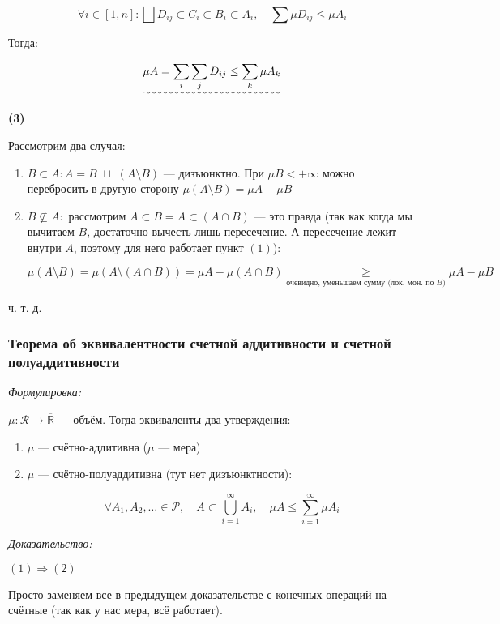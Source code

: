 \documentclass{article}
\def\dbl{\,\,}
\begin{document}
\[\forall i \in [1, n]: \bigsqcup D_{ij} \subset C_i \subset B_i \subset A_i, \quad \sum \mu D_{ij} \le \mu A_i\]

Тогда: 

\[\uwave{\mu A = \sum_{i} \sum_{j} D_{ij} \le \sum_{k} \mu A_k}\]

\textbf{(3)}

Рассмотрим два случая: 

\begin{enumerate}
    \item $B \subset A: A = B \dbl \sqcup \dbl (A \setminus B)$ --- дизъюнктно. При $\mu B < + \infty $ можно перебросить в другую сторону $\mu (A \setminus B) = \mu A - \mu B$
    \item $B \nsubseteq A:$ рассмотрим $A \subset B = A \subset (A \cap B)$ --- это правда (так как когда мы вычитаем $B$, достаточно вычесть лишь пересечение. А пересечение лежит внутри $A$, поэтому для него работает пункт $(1)$):
    
    \[\mu(A \setminus B) = \mu(A \setminus (A \cap B)) = \mu A - \mu (A \cap B) \underset{\text{очевидно, уменьшаем сумму (лок. мон. по } B)}{\ge} \mu A - \mu B\]
\end{enumerate}

ч. т. д. 

\subsubsection{Теорема об эквивалентности счетной аддитивности и счетной полуаддитивности}

\textit{Формулировка:}

$\mu: \mathcal{R} \rightarrow \overline{\mathbb{R}}$ --- объём. Тогда эквиваленты два утверждения:

\begin{enumerate}
    \item $\mu$ --- счётно-аддитивна ($\mu$ --- мера)
    \item $\mu$ --- счётно-полуаддитивна (тут нет дизъюнктности): 
    
    \[\forall A_1, A_2, \ldots \in \mathcal{P}, \quad A \subset \bigcup_{i = 1}^{\infty} A_i, \quad \mu A \le \sum_{i = 1}^{\infty} \mu A_i\]
\end{enumerate}

\textit{Доказательство:}

\textbf{$(1) \Rightarrow (2)$}

Просто заменяем все  в предыдущем доказательстве с конечных операций на счётные (так как у нас мера, всё работает).
\end{document}
